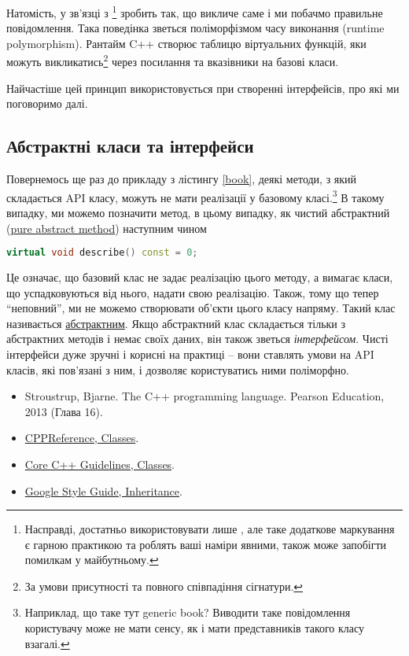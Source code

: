 \documentclass[12pt]{article}
\begin{document}
	Натомість,  у зв'язці з \footnote{Насправді, достатньо використовувати лише , але таке додаткове маркування є гарною практикою та роблять ваші наміри явними, також може запобігти помилкам у майбутньому.} зробить так, що  викличе саме  і ми побачмо правильне повідомлення. Така поведінка зветься поліморфізмом часу виконання (runtime polymorphism). Рантайм C++ створює таблицю віртуальних функцій, яки можуть викликатись\footnote{За умови присутності  та повного співпадіння сігнатури.} через посилання та вказівники на базові класи.

	Найчастіше цей принцип використовується при створенні інтерфейсів, про які ми поговоримо далі.

	\subsection{Абстрактні класи та інтерфейси}
	Повернемось ще раз до прикладу з лістингу \ref{book}, деякі методи, з який складається API класу, можуть не мати реалізації у базовому класі.\footnote{Наприклад, що таке тут generic book? Виводити таке повідомлення користувачу може не мати сенсу, як і мати представників такого класу взагалі.} В такому випадку, ми можемо позначити метод,  в цьому випадку, як чистий абстрактний (\href{https://en.cppreference.com/book/intro/abstract_classes}{pure abstract method}) наступним чином
	\begin{lstlisting}[language=c++]
		virtual void describe() const = 0;
	\end{lstlisting}

	Це означає, що базовий клас  не задає реалізацію цього методу, а вимагає класи, що успадковуються від нього, надати свою реалізацію. Також, тому що  тепер ``неповний'', ми не можемо створювати об'єкти цього класу напряму. Такий клас називається \href{https://en.cppreference.com/w/cpp/language/abstract_class}{абстрактним}. Якщо абстрактний клас складається тільки з абстрактних методів і немає своїх даних, він також зветься \textit{інтерфейсом}. Чисті інтерфейси дуже зручні і корисні на практиці -- вони ставлять умови на API класів, які пов'язані з ним, і дозволяє користуватись ними поліморфно.

	
	\begin{itemize}
		\item Stroustrup, Bjarne. The C++ programming language. Pearson Education, 2013 (Глава 16).
		\item \href{https://en.cppreference.com/w/cpp/language/classes}{CPPReference, Classes}.
		\item \href{https://isocpp.github.io/CppCoreGuidelines/CppCoreGuidelines#c-classes-and-class-hierarchies}{Core C++ Guidelines, Classes}.
		\item \href{https://google.github.io/styleguide/cppguide.html#Inheritance}{Google Style Guide, Inheritance}.
	\end{itemize}
\end{document}
